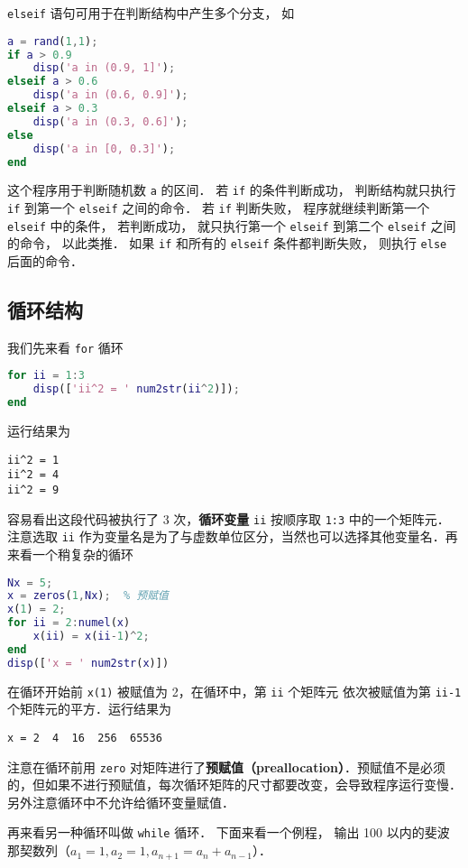 \verb|elseif| 语句可用于在判断结构中产生多个分支， 如

\begin{lstlisting}[language=matlab]
a = rand(1,1);
if a > 0.9
    disp('a in (0.9, 1]');
elseif a > 0.6
    disp('a in (0.6, 0.9]');
elseif a > 0.3
    disp('a in (0.3, 0.6]');
else
    disp('a in [0, 0.3]');
end
\end{lstlisting}

这个程序用于判断随机数 \verb|a| 的区间． 若 \verb|if| 的条件判断成功， 判断结构就只执行 \verb|if| 到第一个 \verb|elseif| 之间的命令． 若 \verb|if| 判断失败， 程序就继续判断第一个 \verb|elseif| 中的条件， 若判断成功， 就只执行第一个 \verb|elseif| 到第二个 \verb|elseif| 之间的命令， 以此类推． 如果 \verb|if| 和所有的 \verb|elseif| 条件都判断失败， 则执行 \verb|else| 后面的命令．

\subsection{循环结构}
我们先来看 \verb|for| 循环

\begin{lstlisting}[language=matlab]
for ii = 1:3
    disp(['ii^2 = ' num2str(ii^2)]);
end
\end{lstlisting}

运行结果为
\begin{lstlisting}[language=matlabC]
ii^2 = 1
ii^2 = 4
ii^2 = 9
\end{lstlisting}
容易看出这段代码被执行了 3 次，\textbf{循环变量} \verb|ii| 按顺序取 \verb|1:3| 中的一个矩阵元．注意选取 \verb|ii| 作为变量名是为了与虚数单位区分，当然也可以选择其他变量名．再来看一个稍复杂的循环

\begin{lstlisting}[language=matlab]
Nx = 5;
x = zeros(1,Nx);  % 预赋值
x(1) = 2;
for ii = 2:numel(x)
    x(ii) = x(ii-1)^2;
end
disp(['x = ' num2str(x)])
\end{lstlisting}

在循环开始前 \verb|x(1)| 被赋值为 2，在循环中，第 \verb|ii| 个矩阵元 依次被赋值为第 \verb|ii-1| 个矩阵元的平方．运行结果为
\begin{lstlisting}[language=matlabC]
x = 2  4  16  256  65536
\end{lstlisting}
注意在循环前用 \verb|zero| 对矩阵进行了\textbf{预赋值（preallocation）}．预赋值不是必须的，但如果不进行预赋值，每次循环矩阵的尺寸都要改变，会导致程序运行变慢．另外注意循环中不允许给循环变量赋值．

再来看另一种循环叫做 \verb|while| 循环． 下面来看一个例程， 输出 100 以内的斐波那契数列（$a_1 = 1, a_2 = 1, a_{n+1} = a_{n} + a_{n-1}$）．

